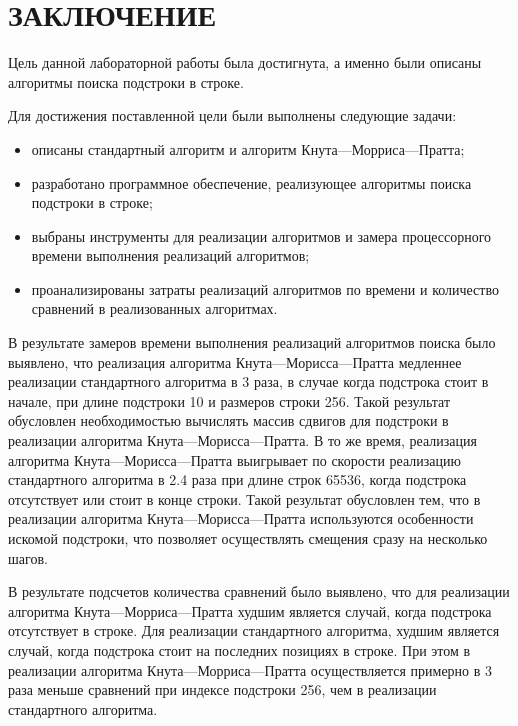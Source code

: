 \chapter*{ЗАКЛЮЧЕНИЕ}

Цель данной лабораторной работы была достигнута, а именно были описаны алгоритмы поиска подстроки в строке.

Для достижения поставленной цели были выполнены следующие задачи:
\begin{itemize}
	\item описаны стандартный алгоритм и алгоритм Кнута---Морриса---Пратта;
	\item разработано программное обеспечение, реализующее алгоритмы поиска подстроки в строке;
	\item выбраны инструменты для реализации алгоритмов и замера процессорного времени выполнения реализаций алгоритмов;
	\item проанализированы затраты реализаций алгоритмов по времени и количество сравнений в реализованных алгоритмах.
\end{itemize}

В результате замеров времени выполнения реализаций алгоритмов поиска было выявлено, что реализация алгоритма Кнута---Морисса---Пратта медленнее реализации стандартного алгоритма в 3 раза, в случае когда подстрока стоит в начале, при длине подстроки 10 и размеров строки 256. 
Такой результат обусловлен необходимостью вычислять массив сдвигов для подстроки в реализации алгоритма Кнута---Морисса---Пратта.
В то же время, реализация алгоритма Кнута---Морисса---Пратта выигрывает по скорости реализацию стандартного алгоритма в 2.4 раза при длине строк 65536, когда подстрока отсутствует или стоит в конце строки. 
Такой результат обусловлен тем, что в реализации алгоритма Кнута---Морисса---Пратта используются особенности искомой подстроки, что позволяет осуществлять смещения сразу на несколько шагов.

В результате подсчетов количества сравнений было выявлено, что для реализации алгоритма Кнута---Морриса---Пратта худшим является случай, когда подстрока отсутствует в строке. 
Для реализации стандартного алгоритма, худшим является случай, когда подстрока стоит на последних позициях в строке. 
При этом в реализации алгоритма Кнута---Морриса---Пратта осуществляется примерно в 3 раза меньше сравнений при индексе подстроки 256, чем в реализации стандартного алгоритма.


